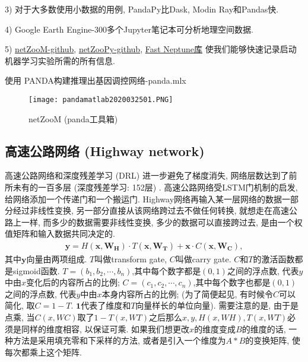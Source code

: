 3) 对于大多数使用小数据的用例, PandaPy比Dask, Modin Ray和Pandas快.

4) Google Earth Engine-300多个Jupyter笔记本可分析地理空间数据.

5) \href{https://github.com/netZoo/netZooM}{netZooM-github}, \href{https://github.com/netZoo/netZooPy}{netZooPy-github},
\href{https://github.com/DanyWind/fast_neptune}{Fast Neptune库} 使我们能够快速记录启动机器学习实验所需的所有信息.
\begin{exampleT}
使用 PANDA构建推理出基因调控网络-panda.mlx
\begin{figure}[H]
    \centering
    \texttt{[image: pandamatlab2020032501.PNG]}
    \caption{netZooM (panda工具箱)}
    \label{pandamatlab2020032501}
    \vspace{-0.5cm}
\end{figure}
\end{exampleT}

\subsection{高速公路网络 (Highway network) }
高速公路网络和深度残差学习 (DRL) 进一步避免了梯度消失, 网络层数达到了前所未有的一百多层 (深度残差学习: 152层) \cite{HeCVPR2016-9590, NIPS2015-5850}.
高速公路网络受LSTM门机制的启发, 给网络添加一个传递门和一个搬运门.
Highway网络再输入某一层网络的数据一部分经过非线性变换, 另一部分直接从该网络跨过去不做任何转换, 就想走在高速公路上一样,
而多少的数据需要非线性变换, 多少的数据可以直接跨过去, 是由一个权值矩阵和输入数据共同决定的.
\begin{align}
    \mathbf{y}=H\left (\mathbf{x}, \mathbf{W}_{\mathbf{H}}\right) \cdot T\left (\mathbf{x}, \mathbf{W}_{\mathbf{T}}\right)+\mathbf{x} \cdot C\left (\mathbf{x}, \mathbf{W}_{\mathbf{C}}\right),
\end{align}
其中$\bm y$向量由两项组成. $T$叫做transform gate, $C$叫做carry gate. $C$和$T$的激活函数都是sigmoid函数.
$T= (b_1, b_2, \cdots, b_n)$,其中每个数字都是$(0, 1)$之间的浮点数, 代表$y$中由$x$变化后的内容所占的比例;
$C= (c_1, c_2, \cdots, c_n)$,其中每个数字也都是$(0, 1)$之间的浮点数, 代表$y$中由$x$本身内容所占的比例;
(为了简便起见, 有时候令$C$可以简化, 取$C=1-T$. $\bm 1$代表了维度和$T$向量样长的单位向量).
需要注意的是, 由于是点乘, 当$C (x,WC)$取了$1-T (x,WT)$之后那么$x, y, H(x,WH), T(x,WT)$必须是同样的维度相容, 以保证可乘.
如果我们想更改$x$的维度变成$B$的维度的话, 一种方法是采用填充零和下采样的方法, 或者是引入一个维度为$A*B$的变换矩阵, 使每次都乘上这个矩阵.

